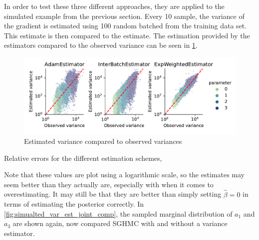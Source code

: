 In order to test these three different approaches, they are applied to the simulated example from the previous section.
Every 10 sample, the variance of the gradient is estimated using 100 random batched from the training data set.
This estimate is then compared to the estimate.
The estimation provided by the estimators compared to the observed variance can be seen in \cref{fig:est_variances_simulated}.
\begin{figure}[htbp]
    \centering
    \includegraphics[width=\linewidth]{Figures/simulated_sghmc_gradient_variance_estimations.pdf}
    \caption{Estimated variance compared to observed variances}
    \label{fig:est_variances_simulated}
\end{figure}
\begin{table}[htbp]
    \centering
    
    \caption{Relative errors for the different estimation schemes,}
\end{table}
Note that these values are plot using a logarithmic scale, so the estimates may seem better than they actually are, especially with when it comes to overestimating. 
It may still be that they are better than simply setting $\hat\beta=0$ in terms of estimating the posterior correctly.
In \cref{fig:simualted_var_est_joint_comp}, the sampled marginal distribution of $a_1$ and $a_3$ are shown again, now compared SGHMC with and without a variance estimator.
